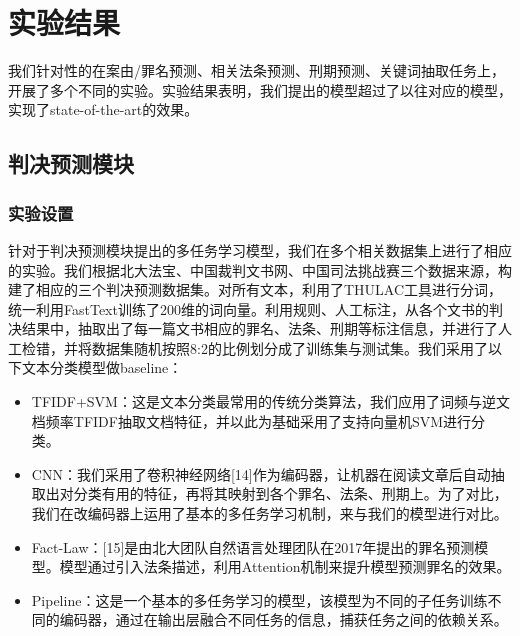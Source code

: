\chapter{实验结果}
\label{cha:result}

我们针对性的在案由/罪名预测、相关法条预测、刑期预测、关键词抽取任务上，开展了多个不同的实验。实验结果表明，我们提出的模型超过了以往对应的模型，实现了state-of-the-art的效果。

\section{判决预测模块}
\subsection{实验设置}

针对于判决预测模块提出的多任务学习模型，我们在多个相关数据集上进行了相应的实验。我们根据北大法宝、中国裁判文书网、中国司法挑战赛三个数据来源，构建了相应的三个判决预测数据集。对所有文本，利用了THULAC工具进行分词，统一利用FastText训练了200维的词向量。利用规则、人工标注，从各个文书的判决结果中，抽取出了每一篇文书相应的罪名、法条、刑期等标注信息，并进行了人工检错，并将数据集随机按照8:2的比例划分成了训练集与测试集。我们采用了以下文本分类模型做baseline：
\begin{itemize}
	\item TFIDF+SVM：这是文本分类最常用的传统分类算法，我们应用了词频与逆文档频率TFIDF抽取文档特征，并以此为基础采用了支持向量机SVM进行分类。
	\item CNN：我们采用了卷积神经网络[14]作为编码器，让机器在阅读文章后自动抽取出对分类有用的特征，再将其映射到各个罪名、法条、刑期上。为了对比，我们在改编码器上运用了基本的多任务学习机制，来与我们的模型进行对比。
	\item Fact-Law：[15]是由北大团队自然语言处理团队在2017年提出的罪名预测模型。模型通过引入法条描述，利用Attention机制来提升模型预测罪名的效果。
	\item Pipeline：这是一个基本的多任务学习的模型，该模型为不同的子任务训练不同的编码器，通过在输出层融合不同任务的信息，捕获任务之间的依赖关系。
\end{itemize}

